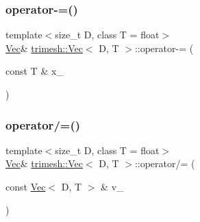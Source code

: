 \mbox{\label{classtrimesh_1_1Vec_ae336ff8bf90960b1da48d9a5fd093b35}} 
\subsubsection{\texorpdfstring{operator-\/=()}{operator-=()}\hspace{0.1cm}{\footnotesize\ttfamily [2/2]}}
{\footnotesize\ttfamily template$<$size\+\_\+t D, class T = float$>$ \\
\hyperlink{classtrimesh_1_1Vec}{Vec}\& \hyperlink{classtrimesh_1_1Vec}{trimesh\+::\+Vec}$<$ D, T $>$\+::operator-\/= (\begin{DoxyParamCaption}\item[{const T \&}]{x\+\_\+ }\end{DoxyParamCaption})\hspace{0.3cm}{\ttfamily [inline]}}

\mbox{\label{classtrimesh_1_1Vec_ab6b99a90ec05a79286a19dd1d5012208}} 
\subsubsection{\texorpdfstring{operator/=()}{operator/=()}\hspace{0.1cm}{\footnotesize\ttfamily [1/2]}}
{\footnotesize\ttfamily template$<$size\+\_\+t D, class T = float$>$ \\
\hyperlink{classtrimesh_1_1Vec}{Vec}\& \hyperlink{classtrimesh_1_1Vec}{trimesh\+::\+Vec}$<$ D, T $>$\+::operator/= (\begin{DoxyParamCaption}\item[{const \hyperlink{classtrimesh_1_1Vec}{Vec}$<$ D, T $>$ \&}]{v\+\_\+ }\end{DoxyParamCaption})\hspace{0.3cm}{\ttfamily [inline]}}

\mbox{\label{classtrimesh_1_1Vec_a68ea46ba41132374ed9be9fb51fec445}} 
